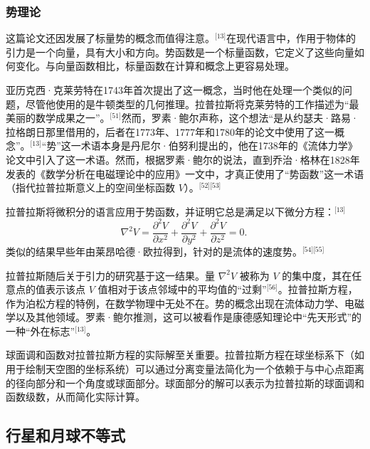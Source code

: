 \subsubsection{势理论}  
这篇论文还因发展了标量势的概念而值得注意。\(^\text{[13]}\)在现代语言中，作用于物体的引力是一个向量，具有大小和方向。势函数是一个标量函数，它定义了这些向量如何变化。与向量函数相比，标量函数在计算和概念上更容易处理。

亚历克西·克莱劳特在1743年首次提出了这一概念，当时他在处理一个类似的问题，尽管他使用的是牛顿类型的几何推理。拉普拉斯将克莱劳特的工作描述为“最美丽的数学成果之一”。\(^\text{[51]}\)然而，罗素·鲍尔声称，这个想法“是从约瑟夫·路易·拉格朗日那里借用的，后者在1773年、1777年和1780年的论文中使用了这一概念”。\(^\text{[13]}\)“势”这一术语本身是丹尼尔·伯努利提出的，他在1738年的《流体力学》论文中引入了这一术语。然而，根据罗素·鲍尔的说法，直到乔治·格林在1828年发表的《数学分析在电磁理论中的应用》一文中，才真正使用了“势函数”这一术语（指代拉普拉斯意义上的空间坐标函数 \( V \)）。\(^\text{[52][53]}\)

拉普拉斯将微积分的语言应用于势函数，并证明它总是满足以下微分方程：\(^\text{[13]}\)
\[
\nabla^2 V = \frac{\partial^2 V}{\partial x^2} + \frac{\partial^2 V}{\partial y^2} + \frac{\partial^2 V}{\partial z^2} = 0.~
\]
类似的结果早些年由莱昂哈德·欧拉得到，针对的是流体的速度势。\(^\text{[54][55]}\)

拉普拉斯随后关于引力的研究基于这一结果。量 \(\nabla^2 V\) 被称为 \(V\) 的集中度，其在任意点的值表示该点 \(V\) 值相对于该点邻域中的平均值的“过剩”\(^\text{[56]}\)。拉普拉斯方程，作为泊松方程的特例，在数学物理中无处不在。势的概念出现在流体动力学、电磁学以及其他领域。罗素·鲍尔推测，这可以被看作是康德感知理论中“先天形式”的一种“外在标志”\(^\text{[13]}\)。

球面调和函数对拉普拉斯方程的实际解至关重要。拉普拉斯方程在球坐标系下（如用于绘制天空图的坐标系统）可以通过分离变量法简化为一个依赖于与中心点距离的径向部分和一个角度或球面部分。球面部分的解可以表示为拉普拉斯的球面调和函数级数，从而简化实际计算。
\subsection{行星和月球不等式}

